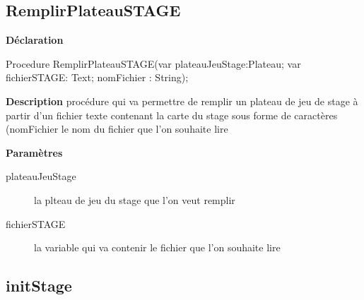 \documentclass{report}
\newif\ifpdf
\begin{document}
\subsection*{RemplirPlateauSTAGE}
\fi
\label{Stage-RemplirPlateauSTAGE}
\begin{list}{}{
\setlength{\itemindent}{0cm}
\setlength{\listparindent}{0cm}
\setlength{\leftmargin}{\evensidemargin}
\addtolength{\leftmargin}{\tmplength}
\settowidth{\labelsep}{X}
\addtolength{\leftmargin}{\labelsep}
\setlength{\labelwidth}{\tmplength}
}
\item[\textbf{Déclaration}\hfill]
\ifpdf
\begin{flushleft}
\fi
\begin{ttfamily}
Procedure RemplirPlateauSTAGE(var plateauJeuStage:Plateau; var fichierSTAGE: Text; nomFichier : String);\end{ttfamily}

\ifpdf
\end{flushleft}
\fi

\par
\item[\textbf{Description}]
procédure qui va permettre de remplir un plateau de jeu de stage à partir d'un fichier texte contenant la carte du stage sous forme de caractères   (nomFichier le nom du fichier que l'on souhaite lire\par
\item[\textbf{Paramètres}]
\begin{description}
\item[plateauJeuStage] la plteau de jeu du stage que l'on veut remplir
\item[fichierSTAGE] la variable qui va contenir le fichier que l'on souhaite lire
\item[] 
\end{description}


\end{list}
\ifpdf
\subsection*{\large{\textbf{initStage}}\normalsize\hspace{1ex}\hrulefill}
\else
\end{document}
